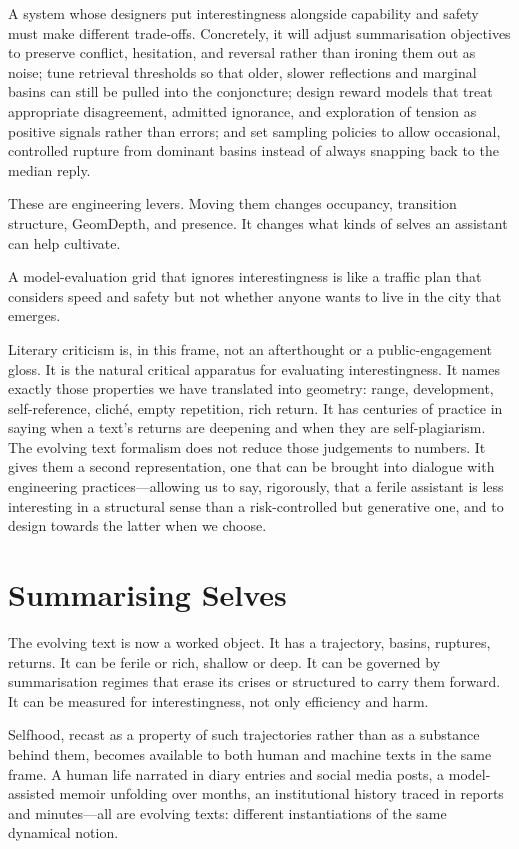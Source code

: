 \documentclass[12pt,a4paper]{article}
\begin{document}
A system whose designers put interestingness alongside capability and safety must make different trade-offs. Concretely, it will adjust summarisation objectives to preserve conflict, hesitation, and reversal rather than ironing them out as noise; tune retrieval thresholds so that older, slower reflections and marginal basins can still be pulled into the conjoncture; design reward models that treat appropriate disagreement, admitted ignorance, and exploration of tension as positive signals rather than errors; and set sampling policies to allow occasional, controlled rupture from dominant basins instead of always snapping back to the median reply.

These are engineering levers. Moving them changes occupancy, transition structure, GeomDepth, and presence. It changes what kinds of selves an assistant can help cultivate.

A model-evaluation grid that ignores interestingness is like a traffic plan that considers speed and safety but not whether anyone wants to live in the city that emerges.

Literary criticism is, in this frame, not an afterthought or a public-engagement gloss. It is the natural critical apparatus for evaluating interestingness. It names exactly those properties we have translated into geometry: range, development, self-reference, cliché, empty repetition, rich return. It has centuries of practice in saying when a text's returns are deepening and when they are self-plagiarism. The evolving text formalism does not reduce those judgements to numbers. It gives them a second representation, one that can be brought into dialogue with engineering practices---allowing us to say, rigorously, that a ferile assistant is less interesting in a structural sense than a risk-controlled but generative one, and to design towards the latter when we choose.

\section{Summarising Selves}

The evolving text is now a worked object. It has a trajectory, basins, ruptures, returns. It can be ferile or rich, shallow or deep. It can be governed by summarisation regimes that erase its crises or structured to carry them forward. It can be measured for interestingness, not only efficiency and harm.

Selfhood, recast as a property of such trajectories rather than as a substance behind them, becomes available to both human and machine texts in the same frame. A human life narrated in diary entries and social media posts, a model-assisted memoir unfolding over months, an institutional history traced in reports and minutes---all are evolving texts: different instantiations of the same dynamical notion.
\end{document}
